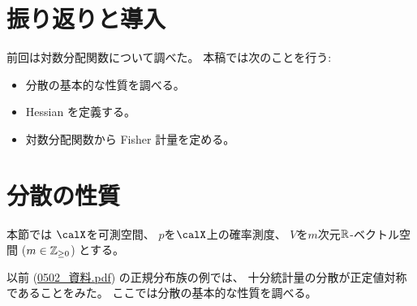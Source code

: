 \documentclass[report]{jlreq}
\begin{document}
%

%
\section*{振り返りと導入}

前回は対数分配関数について調べた。
本稿では次のことを行う:
\begin{itemize}
    \item 分散の基本的な性質を調べる。
    \item Hessian を定義する。
    \item 対数分配関数から Fisher 計量を定める。
\end{itemize}

%
\section{分散の性質}

本節では
$\calX$を可測空間、
$p$を$\calX$上の確率測度、
$V$を$m$次元$\mathbb{R}$-ベクトル空間 ($m \in \mathbb{Z}_{\ge 0}$)
とする。

以前 (\url{0502_資料.pdf}) の正規分布族の例では、
十分統計量の分散が正定値対称であることをみた。
ここでは分散の基本的な性質を調べる。

\end{document}
